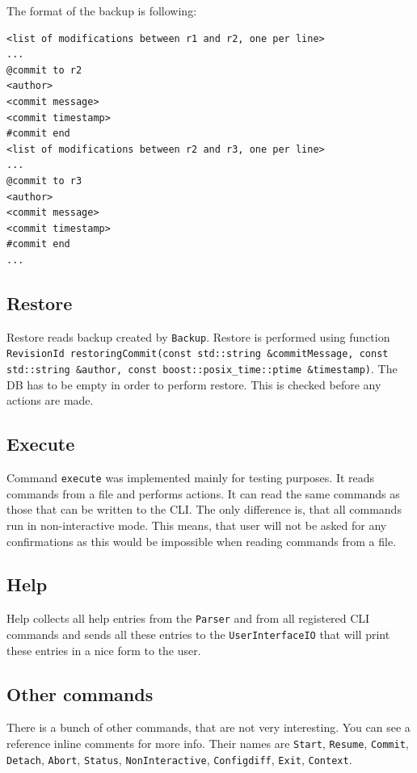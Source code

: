 \documentclass[deska]{subfiles}
\begin{document}
The format of the backup is following:

\begin{verbatim}
<list of modifications between r1 and r2, one per line>
...
@commit to r2
<author>
<commit message>
<commit timestamp>
#commit end
<list of modifications between r2 and r3, one per line>
...
@commit to r3
<author>
<commit message>
<commit timestamp>
#commit end
...
\end{verbatim}

\subsection{Restore}

Restore reads backup created by {\tt Backup}. Restore is performed using function {\tt RevisionId restoringCommit(const
std::string \&commitMessage, const std::string \&author, const boost::posix\_time::ptime \&timestamp)}. The DB has to be empty
in order to perform restore. This is checked before any actions are made.

\subsection{Execute}

Command {\tt execute} was implemented mainly for testing purposes. It reads commands from a file and performs actions. It
can read the same commands as those that can be written to the CLI. The only difference is, that all commands run in non-interactive
mode. This means, that user will not be asked for any confirmations as this would be impossible when reading commands from
a file.

\subsection{Help}

Help collects all help entries from the {\tt Parser} and from all registered CLI commands and sends all these entries to the
{\tt UserInterfaceIO} that will print these entries in a nice form to the user.

\subsection{Other commands}

There is a bunch of other commands, that are not very interesting. You can see a reference inline comments for more info.
Their names are {\tt Start}, {\tt Resume}, {\tt Commit}, {\tt Detach}, {\tt Abort}, {\tt Status}, {\tt NonInteractive},
{\tt Configdiff}, {\tt Exit}, {\tt Context}.
\end{document}
